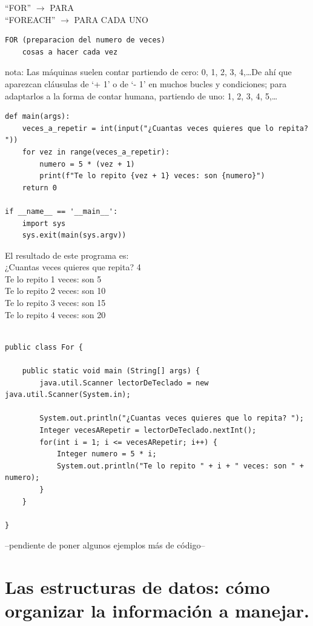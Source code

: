 \documentclass[spanish,12pt,a4paper,final,oneside]{book}
\begin{document}
``FOR'' $\rightarrow$ PARA
\\``FOREACH'' $\rightarrow$ PARA CADA UNO
\begin{lstlisting}
FOR (preparacion del numero de veces)
    cosas a hacer cada vez
\end{lstlisting}

nota: Las máquinas suelen contar partiendo de cero: 0, 1, 2, 3, 4,\ldots De ahí que aparezcan cláusulas de `+ 1' o de `- 1' en muchos bucles y condiciones; para adaptarlos a la forma de contar humana, partiendo de uno: 1, 2, 3, 4, 5,\ldots

\begin{lstlisting}[frame=single, caption=lenguaje python]
def main(args):
    veces_a_repetir = int(input("¿Cuantas veces quieres que lo repita? "))
    for vez in range(veces_a_repetir):
        numero = 5 * (vez + 1)
        print(f"Te lo repito {vez + 1} veces: son {numero}")
    return 0

if __name__ == '__main__':
    import sys
    sys.exit(main(sys.argv))
\end{lstlisting}

El resultado de este programa es:
\\¿Cuantas veces quieres que repita? 4
\\Te lo repito  1  veces: son  5
\\Te lo repito  2  veces: son  10
\\Te lo repito  3  veces: son  15
\\Te lo repito  4  veces: son  20


\begin{lstlisting}[frame=single, caption=lenguaje java]

public class For {
	
    public static void main (String[] args) {
        java.util.Scanner lectorDeTeclado = new java.util.Scanner(System.in);
        
        System.out.println("¿Cuantas veces quieres que lo repita? ");
        Integer vecesARepetir = lectorDeTeclado.nextInt();
        for(int i = 1; i <= vecesARepetir; i++) {
            Integer numero = 5 * i;
            System.out.println("Te lo repito " + i + " veces: son " + numero);
        }
    }
    
}
\end{lstlisting}

--pendiente de poner algunos ejemplos más de código--

 


\chapter{Las estructuras de datos: cómo organizar la información a manejar.}
\end{document}
